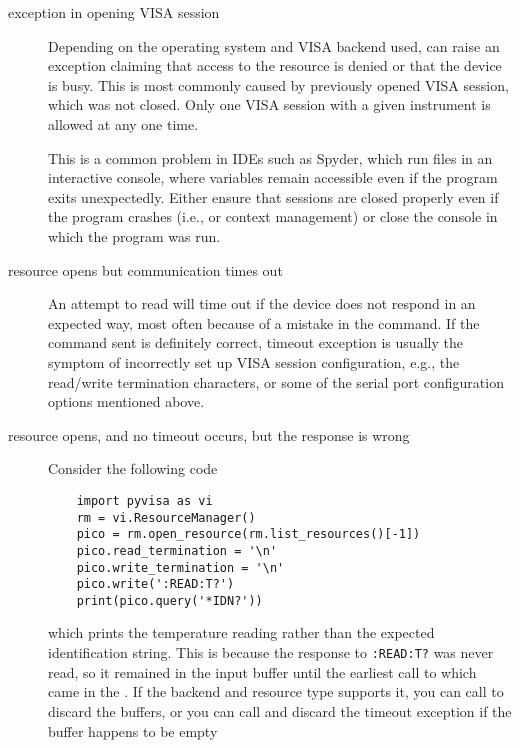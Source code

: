 \begin{description}
    \item[exception in opening VISA session] Depending on the operating system and VISA backend used,  can raise an exception claiming that access to the resource is denied or that the device is busy. This is most commonly caused by previously opened VISA session, which was not closed. Only one VISA session with a given instrument is allowed at any one time.
    
    This is a common problem in IDEs such as Spyder, which run files in an interactive console, where variables remain accessible even if the program exits unexpectedly. Either ensure that sessions are closed properly even if the program crashes (i.e.,  or context management) or close the console in which the program was run.

    \item[resource opens but communication times out] An attempt to read will time out if the device does not respond in an expected way, most often because of a mistake in the command. If the command sent is definitely correct, timeout exception is usually the symptom of incorrectly set up VISA session configuration, e.g., the read/write termination characters, or some of the serial port configuration options mentioned above.
    
    \item[resource opens, and no timeout occurs, but the response is wrong] Consider the following code
\begin{lstlisting}
    import pyvisa as vi
    rm = vi.ResourceManager()
    pico = rm.open_resource(rm.list_resources()[-1])    
    pico.read_termination = '\n'
    pico.write_termination = '\n'
    pico.write(':READ:T?')
    print(pico.query('*IDN?'))
\end{lstlisting}
    which prints the temperature reading rather than the expected identification string. This is because the response to \verb|:READ:T?| was never read, so it remained in the input buffer until the earliest call to  which came in the . If the backend and resource type supports it, you can call  to discard the buffers, or you can call  and discard the timeout exception if the buffer happens to be empty
\end{description}